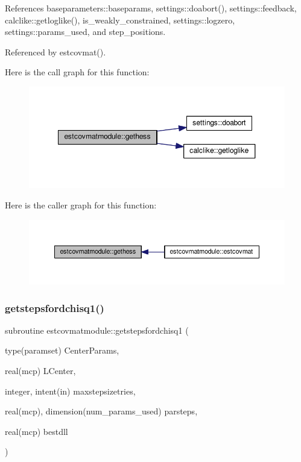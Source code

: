 References baseparameters\+::baseparams, settings\+::doabort(), settings\+::feedback, calclike\+::getloglike(), is\+\_\+weakly\+\_\+constrained, settings\+::logzero, settings\+::params\+\_\+used, and step\+\_\+positions.



Referenced by estcovmat().

Here is the call graph for this function\+:
\nopagebreak
\begin{figure}[H]
\begin{center}
\leavevmode
\includegraphics[width=348pt]{namespaceestcovmatmodule_a24745156f0a9a14a853ca7db8796afdc_cgraph}
\end{center}
\end{figure}
Here is the caller graph for this function\+:
\nopagebreak
\begin{figure}[H]
\begin{center}
\leavevmode
\includegraphics[width=350pt]{namespaceestcovmatmodule_a24745156f0a9a14a853ca7db8796afdc_icgraph}
\end{center}
\end{figure}
\mbox{\label{namespaceestcovmatmodule_ac80cbfe7c3c7ed84526e57a069e41ccf}} 
\subsubsection{\texorpdfstring{getstepsfordchisq1()}{getstepsfordchisq1()}}
{\footnotesize\ttfamily subroutine estcovmatmodule\+::getstepsfordchisq1 (\begin{DoxyParamCaption}\item[{type(paramset)}]{Center\+Params,  }\item[{real(mcp)}]{L\+Center,  }\item[{integer, intent(in)}]{maxstepsizetries,  }\item[{real(mcp), dimension(num\+\_\+params\+\_\+used)}]{parsteps,  }\item[{real(mcp)}]{bestdll }\end{DoxyParamCaption})}



